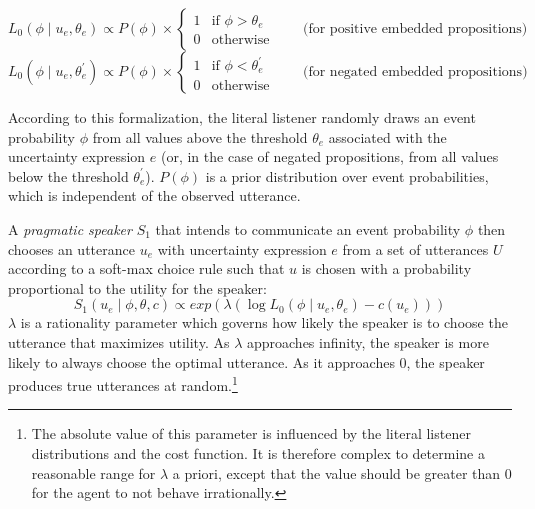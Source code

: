 \documentclass[man, floatsintext]{apa6}
\begin{document}
$$L_0\left(\phi \mid u_e, \theta_e\right) \propto P(\phi) \times 
\begin{cases}
1 & \mbox{if } \phi > \theta_e\\
0 & \mbox{otherwise} 
\end{cases} \qquad \mbox{(for positive embedded propositions)}$$
$$L_0\left(\phi \mid u_e, \theta_e^{'}\right) \propto P(\phi) \times 
\begin{cases}
1 & \mbox{if } \phi < \theta_e^{'} \\
0 & \mbox{otherwise} 
\end{cases} \qquad \mbox{(for negated embedded propositions)}$$

According to this formalization, the {literal listener}  randomly draws an event probability $\phi$ from all values above  the threshold $\theta_e$ associated with the uncertainty expression $e$ (or, in the case of negated propositions, from all values below the threshold $\theta_e^{'}$). $P(\phi)$ is a prior distribution over event probabilities, which is independent of the observed utterance.

A \textit{pragmatic speaker} $S_1$ that intends to communicate an event probability $\phi$ then chooses an utterance $u_e$ with uncertainty expression $e$ from a set of utterances $U$ according to a soft-max choice rule \parencite{Luce1959,Sutton1998} such that $u$ is chosen with a probability proportional to the utility for the speaker:
$$S_1\left(u_e \mid \phi, \theta, c\right) \propto exp \left( \lambda \left( \log L_0\left(\phi \mid u_e, \theta_e\right)  - c(u_e)\right)\right)$$
$\lambda$ is a rationality parameter which governs how likely the {speaker} is to choose the utterance that maximizes utility. As $\lambda$ approaches infinity, the {speaker} is more likely to always choose the optimal utterance. As it approaches 0, the {speaker} produces true utterances at random.\footnote{
The absolute value of this parameter is influenced by the literal listener distributions and the cost function. It is therefore complex to determine a reasonable range for $\lambda$ a priori, except that the value should be greater than 0 for the agent to not behave irrationally.} %
\end{document}
